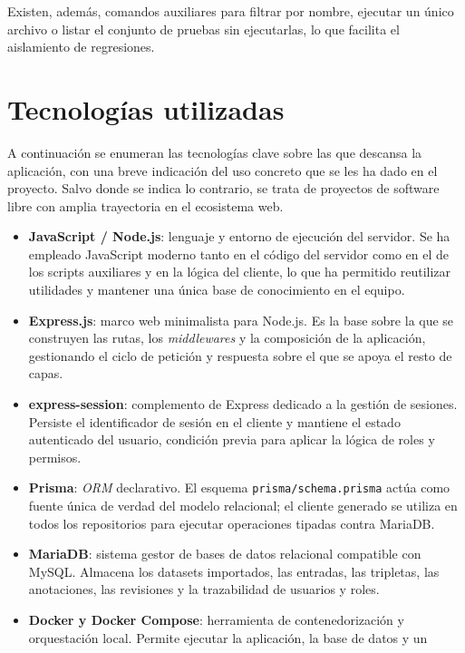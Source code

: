 Existen, además, comandos auxiliares para filtrar por nombre, ejecutar un
único archivo o listar el conjunto de pruebas sin ejecutarlas, lo que
facilita el aislamiento de regresiones.

\section{Tecnologías utilizadas}

A continuación se enumeran las tecnologías clave sobre las que descansa la
aplicación, con una breve indicación del uso concreto que se les ha dado en el
proyecto. Salvo donde se indica lo contrario, se trata de proyectos de software
libre con amplia trayectoria en el ecosistema web.

\begin{itemize}
	\item \textbf{JavaScript / Node.js}: lenguaje y entorno de ejecución del servidor. Se
	      ha empleado JavaScript moderno tanto en el código del servidor como en el de
	      los scripts auxiliares y en la lógica del cliente, lo que ha permitido
	      reutilizar utilidades y mantener una única base de conocimiento en el equipo.
	\item \textbf{Express.js}: marco web minimalista para Node.js. Es la base sobre la
	      que se construyen las rutas, los \textit{middlewares} y la composición de la
	      aplicación, gestionando el ciclo de petición y respuesta sobre el que se apoya
	      el resto de capas.
	\item \textbf{express-session}: complemento de Express dedicado a la gestión de
	      sesiones. Persiste el identificador de sesión en el cliente y mantiene el
	      estado autenticado del usuario, condición previa para aplicar la lógica de
	      roles y permisos.
	\item \textbf{Prisma}: \textit{ORM} declarativo. El esquema
	      \texttt{prisma/schema.prisma} actúa como fuente única de verdad del modelo
	      relacional; el cliente generado se utiliza en todos los repositorios para
	      ejecutar operaciones tipadas contra MariaDB.
	\item \textbf{MariaDB}: sistema gestor de bases de datos relacional compatible con
	      MySQL. Almacena los datasets importados, las entradas, las tripletas, las
	      anotaciones, las revisiones y la trazabilidad de usuarios y roles.
	\item \textbf{Docker y Docker Compose}: herramienta de contenedorización y
	      orquestación local. Permite ejecutar la aplicación, la base de datos y un

\end{itemize}
